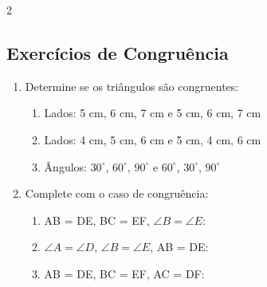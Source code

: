 \documentclass[11pt]{article}
\begin{document}
\begin{multicols}{2}
\begin{center}
\end{center}
\subsection*{Exercícios de Congruência}
\begin{enumerate}
    \item Determine se os triângulos são congruentes:
    \begin{enumerate}[label=\alph*)]
        \item Lados: 5 cm, 6 cm, 7 cm e 5 cm, 6 cm, 7 cm
        \item Lados: 4 cm, 5 cm, 6 cm e 5 cm, 4 cm, 6 cm
        \item Ângulos: $30^\circ$, $60^\circ$, $90^\circ$ e $60^\circ$, $30^\circ$, $90^\circ$
    \end{enumerate}
    
    \item Complete com o caso de congruência:
    \begin{enumerate}[label=\alph*)]
        \item AB = DE, BC = EF, $\angle B = \angle E$: \underline{\hspace{2cm}}
        \item $\angle A = \angle D$, $\angle B = \angle E$, AB = DE: \underline{\hspace{2cm}}
        \item AB = DE, BC = EF, AC = DF: \underline{\hspace{2cm}}
    \end{enumerate}
\end{enumerate}


\end{multicols}
\end{document}
